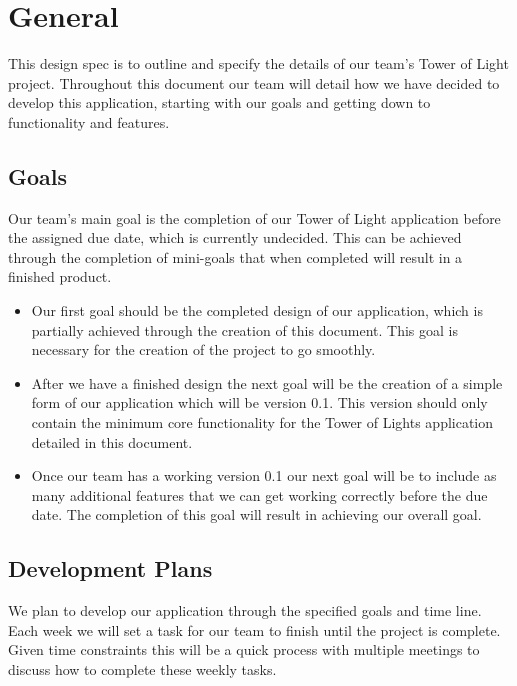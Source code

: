 \documentclass{article}
\begin{document}
\section{General}
This design spec is to outline and specify the details of our team's Tower of Light project. Throughout this document our team will detail how we have decided to develop this application, starting with our goals and getting down to functionality and features.
\subsection{Goals}
Our team's main goal is the completion of our Tower of Light application before the assigned due date, which is currently undecided. This can be achieved through the completion of mini-goals that when completed will result in a finished product.
	\begin{itemize}
		\item Our first goal should be the completed design of our application, which is partially achieved through the creation of this document. This goal is necessary for the creation of the 				project to go smoothly.
		\item After we have a finished design the next goal will be the creation of a simple form of our application which will be version 0.1. This version should only contain the minimum core 				functionality for the Tower of Lights application detailed in this document.
		\item Once our team has a working version 0.1 our next goal will be to include as many additional features that we can get working correctly before the due date. The completion of this goal will result in achieving our overall goal.
	\end{itemize}
\subsection{Development Plans}
We plan to develop our application through the specified goals and time line. Each week we will set a task for our team to finish until the project is complete. Given time constraints this will be a quick process with multiple meetings to discuss how to complete these weekly tasks. 
\end{document}
